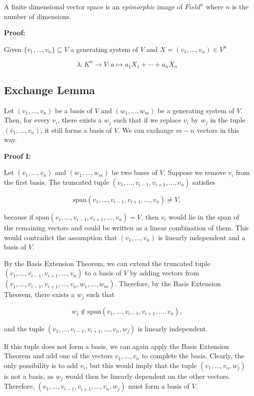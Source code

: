 A finite dimensional vector space is an \emph{epimorphic} image of \(Field^n\) where \(n\) is the number of dimensions.

\textbf{Proof:}

Given \(\{v_1, \dots, v_n\} \subseteq V\) a generating system of \(V\) and \(X = (v_1, \dots, v_n) \in V^n\)

\[
	\lambda: K^n \to V: a \mapsto a_1 X_1 + \cdots + a_n X_n
\]

\subsection{Exchange Lemma}

Let \((v_1, \ldots, v_n)\) be a basis of \(V\) and \((w_1, \ldots, w_m)\) be a generating system of \(V\). Then, for every
\(v_i\), there exists a \(w_j\) such that if we replace \(v_i\) by \(w_j\) in the tuple
\((v_1, \ldots, v_n)\), it still forms a basis of \(V\). We can exchange \(m - n\) vectors in this way.

\textbf{Proof I:}

Let \((v_1, \ldots, v_n)\) and \((w_1, \ldots, w_m)\) be two bases of \(V\). Suppose we remove \(v_i\)
from the first basis. The truncated tuple \((v_1, \ldots, v_{i-1}, v_{i+1}, \ldots, v_n)\) satisfies

\[
	\mathrm{span}(v_1, \ldots, v_{i-1}, v_{i+1}, \ldots, v_n) \neq V,
\]

because if \(\mathrm{span}(v_1, \ldots, v_{i-1}, v_{i+1}, \ldots, v_n) = V\), then \(v_i\) would lie in the
span of the remaining vectors and could be written as a linear combination of them. This would contradict
the assumption that \((v_1, \ldots, v_n)\) is linearly independent and a basis of \(V\).

By the Basis Extension Theorem, we can extend the truncated
tuple \((v_1, \ldots, v_{i-1}, v_{i+1}, \ldots, v_n)\) to a basis of \(V\) by
adding vectors from \((v_1, \ldots, v_{i-1}, v_{i+1}, \ldots, v_n, w_1, \ldots, w_m)\).
Therefore, by the Basis Extension Theorem, there exists a \(w_j\) such that

\[
	w_j \notin \mathrm{span}(v_1, \ldots, v_{i-1}, v_{i+1}, \ldots, v_n),
\]

and the tuple \((v_1, \ldots, v_{i-1}, v_{i+1}, \ldots, v_n, w_j)\) is linearly independent.

If this tuple does not form a basis, we can again apply the Basis Extension Theorem
and add one of the vectors \(v_1, \ldots, v_n\) to complete the basis. Clearly, the only possibility is
to add \(v_i\), but this would imply that the tuple \((v_1, \ldots, v_n, w_j)\) is not a basis, as
\(w_j\) would then be linearly dependent on the other vectors.
Therefore, \((v_1, \ldots, v_{i-1}, v_{i+1}, \ldots, v_n, w_j)\) must form a basis of \(V\).

